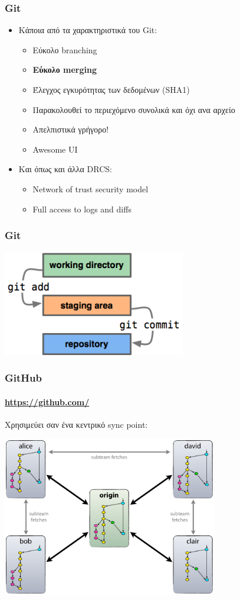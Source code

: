 \documentclass[handout]{beamer}
\begin{document}
\begin{frame}
  \frametitle{Git}
  \begin{itemize}
    \item Κάποια από τα χαρακτηριστικά του Git:
      \begin{itemize}
        \item Εύκολο branching \pause
        \item \textbf{Εύκολο merging} \pause
        \item Έλεγχος εγκυρότητας των δεδομένων (SHA1) \pause
        \item Παρακολουθεί το περιεχόμενο συνολικά και όχι ανα αρχείο \pause
        \item Απελπιστικά γρήγορο! \pause
        \item Awesome UI \pause
      \end{itemize}
    \item Και όπως και άλλα DRCS: \pause
      \begin{itemize}
        \item Network of trust security model \pause
        \item Full access to logs and diffs
      \end{itemize}
  \end{itemize}
\end{frame}

\begin{frame}
  \frametitle{Git}
  \begin{center}
    \includegraphics[width=8cm]{index1.png}
  \end{center}
\end{frame}

\begin{frame}
  \frametitle{GitHub}
  \framesubtitle{\url{https://github.com/}}
  Χρησιμεύει σαν ένα κεντρικό sync point:
  \begin{center}
    \includegraphics[height=7cm]{centr-decentr.png}
  \end{center}
\end{frame}
\end{document}
